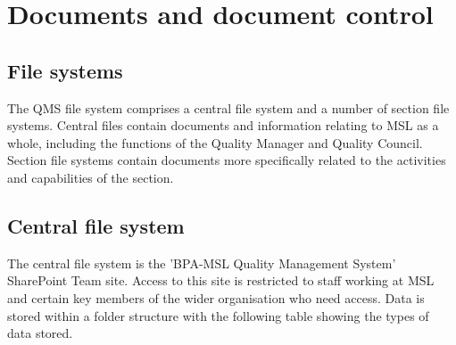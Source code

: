 \section{Documents and document control}
\label{s:documents_and_document_control}
\subsection{File systems}
The QMS file system comprises a central file system and a number of section file systems. Central files contain documents and information relating to MSL as a whole, including the functions of the Quality Manager and Quality Council.  Section file systems contain documents more specifically related to the activities and capabilities of the section.

\subsection{Central file system}
\label{ss:central_file_system}
The central file system is the 'BPA-MSL Quality Management System' SharePoint Team site. Access to this site is restricted to staff working at MSL and certain key members of the wider organisation who need access.  Data is stored within a folder structure with the following table showing the types of data stored.

